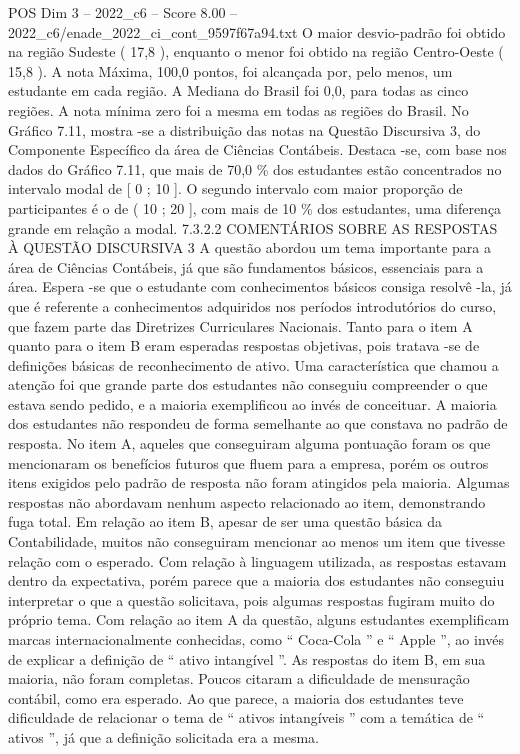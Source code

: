 \begin{textsample}{POS Dim 3 – 2022\_c6 – Score 8.00 – 2022\_c6/enade\_2022\_ci\_cont\_9597f67a94.txt}
O maior desvio-padrão foi obtido na região Sudeste ( 17,8 ), enquanto o menor foi obtido na região Centro-Oeste ( 15,8 ).
A nota Máxima, 100,0 pontos, foi alcançada por, pelo menos, um estudante em cada região.
A Mediana do Brasil foi 0,0, para todas as cinco regiões.
A nota mínima zero foi a mesma em todas as regiões do Brasil.
No Gráfico 7.11, mostra -se a distribuição das notas na Questão Discursiva 3, do Componente Específico da área de Ciências Contábeis.
Destaca -se, com base nos dados do Gráfico 7.11, que mais de 70,0 \% dos estudantes estão concentrados no intervalo modal de [ 0 ; 10 ].
O segundo intervalo com maior proporção de participantes é o de ( 10 ; 20 ], com mais de 10 \% dos estudantes, uma diferença grande em relação a modal. 7.3.2.2 COMENTÁRIOS SOBRE AS RESPOSTAS À QUESTÃO DISCURSIVA 3 A questão abordou um tema importante para a área de Ciências Contábeis, já que são fundamentos básicos, essenciais para a área.
Espera -se que o estudante com conhecimentos básicos consiga resolvê -la, já que é referente a conhecimentos adquiridos nos períodos introdutórios do curso, que fazem parte das Diretrizes Curriculares Nacionais.
Tanto para o item A quanto para o item B eram esperadas respostas objetivas, pois tratava -se de definições básicas de reconhecimento de ativo.
Uma característica que chamou a atenção foi que grande parte dos estudantes não conseguiu compreender o que estava sendo pedido, e a maioria exemplificou ao invés de conceituar.
A maioria dos estudantes não respondeu de forma semelhante ao que constava no padrão de resposta.
No item A, aqueles que conseguiram alguma pontuação foram os que mencionaram os benefícios futuros que fluem para a empresa, porém os outros itens exigidos pelo padrão de resposta não foram atingidos pela maioria.
Algumas respostas não abordavam nenhum aspecto relacionado ao item, demonstrando fuga total.
Em relação ao item B, apesar de ser uma questão básica da Contabilidade, muitos não conseguiram mencionar ao menos um item que tivesse relação com o esperado.
Com relação à linguagem utilizada, as respostas estavam dentro da expectativa, porém parece que a maioria dos estudantes não conseguiu interpretar o que a questão solicitava, pois algumas respostas fugiram muito do próprio tema.
Com relação ao item A da questão, alguns estudantes exemplificam marcas internacionalmente conhecidas, como “ Coca-Cola ” e “ Apple ”, ao invés de explicar a definição de “ ativo intangível ”.
As respostas do item B, em sua maioria, não foram completas.
Poucos citaram a dificuldade de mensuração contábil, como era esperado.
Ao que parece, a maioria dos estudantes teve dificuldade de relacionar o tema de “ ativos intangíveis ” com a temática de “ ativos ”, já que a definição solicitada era a mesma.

\end{textsample}
